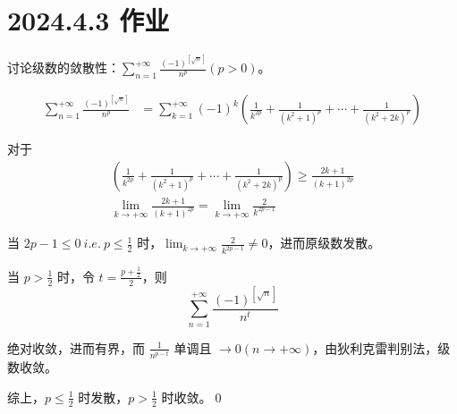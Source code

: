 \ifx\allfiles\undefined

\date{}
\author{尹锦润}

\maketitle
\fi

\section{2024.4.3 作业}
\begin{ques}
	讨论级数的敛散性：$\displaystyle \sum _{n=1}^{+\infty }\frac{( -1)^{\left[\sqrt{n}\right]}}{n^{p}}( p >0)$。
\end{ques}




\begin{align*}
	\sum _{n=1}^{+\infty }\frac{( -1)^{\left[\sqrt{n}\right]}}{n^{p}} & =\sum _{k=1}^{+\infty }( -1)^{k}\left(\frac{1}{k^{2p}} +\frac{1}{\left( k^{2} +1\right)^{p}} +\cdots +\frac{1}{\left( k^{2} +2k\right)^{p}}\right)
\end{align*}


对于
\begin{gather*}
	\left(\frac{1}{k^{2p}} +\frac{1}{\left( k^{2} +1\right)^{p}} +\cdots +\frac{1}{\left( k^{2} +2k\right)^{p}}\right) \geqslant \frac{2k+1}{( k+1)^{2p}}\\
	\lim _{k\rightarrow +\infty }\frac{2k+1}{( k+1)^{2p}} =\lim _{k\rightarrow +\infty }\frac{2}{k^{2p-1}}
\end{gather*}


当 $\displaystyle 2p-1\leqslant 0\ i.e.\ p\leqslant \frac{1}{2}$ 时，$\displaystyle \lim _{k\rightarrow +\infty }\frac{2}{k^{2p-1}} \neq 0$，进而原级数发散。

当 $\displaystyle p >\frac{1}{2}$ 时，令 $\displaystyle t=\frac{p+\frac{1}{2}}{2}$，则
\begin{equation*}
	\sum _{n=1}^{+\infty }\frac{( -1)^{\left[\sqrt{n}\right]}}{n^{t}}
\end{equation*}


绝对收敛，进而有界，而 $\displaystyle \frac{1}{n^{p-t}}$ 单调且 $\displaystyle \rightarrow 0\left( n\rightarrow +\infty \right)$，由狄利克雷判别法，级数收敛。

综上，$\displaystyle p\leqslant \frac{1}{2}$ 时发散，$\displaystyle p >\frac{1}{2}$ 时收敛。\qed 







